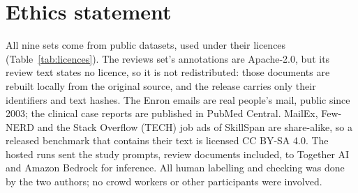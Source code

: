 \section*{Ethics statement}

All nine sets come from public datasets, used under their licences (Table~\ref{tab:licences}).
The reviews set's annotations are Apache-2.0, but its review text states no licence, so it is not redistributed: those documents are rebuilt locally from the original source, and the release carries only their identifiers and text hashes.
The Enron emails are real people's mail, public since 2003; the clinical case reports are published in PubMed Central.
MailEx, Few-NERD and the Stack Overflow (TECH) job ads of SkillSpan are share-alike, so a released benchmark that contains their text is licensed CC BY-SA 4.0.
The hosted runs sent the study prompts, review documents included, to Together AI and Amazon Bedrock for inference.
All human labelling and checking was done by the two authors; no crowd workers or other participants were involved.
